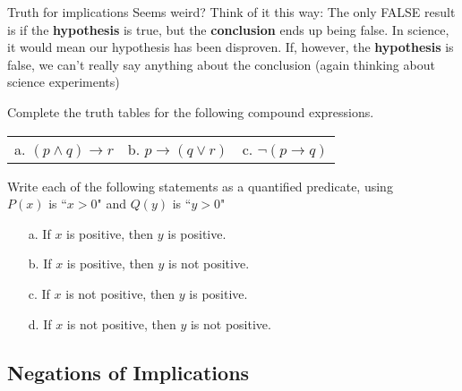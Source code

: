 {\begin{intro}{Truth for implications}
            Seems weird? Think of it this way: The only FALSE result is if
            the \textbf{hypothesis} is true, but the \textbf{conclusion}
            ends up being false. In science, it would mean our hypothesis
            has been disproven. If, however, the \textbf{hypothesis}
            is false, we can't really say anything about the conclusion
            (again thinking about science experiments)
        \end{intro}

    \begin{questionNOGRADE}{\thequestion}
        Complete the truth tables for the following
        compound expressions.

        \begin{center}
            \begin{tabular}{p{4cm} p{4cm} p{4cm}}
                a. $(p \land q) \to r$ &
                b. $p \to (q \lor r)$ &
                c. $\neg( p \to q )$
            \end{tabular}
        \end{center}        
    \end{questionNOGRADE}

    \hrulefill

    \begin{questionNOGRADE}{\thequestion}
        Write each of the following statements as a
        quantified predicate, using \\
        $P(x)$ is ``$x > 0$" and
        $Q(y)$ is ``$y > 0$"

        \begin{enumerate}
            \item[a.] If $x$ is positive, then $y$ is positive. 
            \item[b.] If $x$ is positive, then $y$ is not positive. 
            \item[c.] If $x$ is not positive, then $y$ is positive. 
            \item[d.] If $x$ is not positive, then $y$ is not positive.
        \end{enumerate}        
    \end{questionNOGRADE}

    \newpage

    \subsection{Negations of Implications}

}
